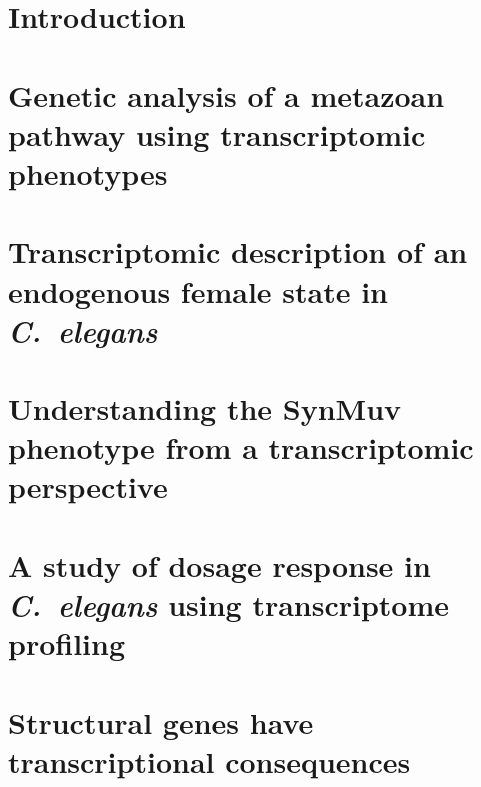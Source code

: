 \documentclass[12pt]{caltech_thesis}
\newcommand{\cel}{\emph{C.~elegans}}
\begin{document}
\tableofcontents
\listoffigures
\listoftables
\printnomenclature{}

\mainmatter{}

\chapter{Introduction}
\begin{refsection}
  
  \printbibliography[heading=subbibliography]
\end{refsection}

\chapter{Genetic analysis of a metazoan pathway using transcriptomic phenotypes}
\begin{refsection}
  
  \printbibliography[heading=subbibliography]
\end{refsection}

\chapter{Transcriptomic description of an endogenous female state in \cel{}}
\begin{refsection}
\end{refsection}

\chapter{Understanding the SynMuv phenotype from a transcriptomic perspective}
\begin{refsection}
\end{refsection}

\chapter{A study of dosage response in \cel{} using transcriptome profiling}
\begin{refsection}
\end{refsection}

\chapter{Structural genes have transcriptional consequences}
\begin{refsection}
\end{refsection}
\end{document}
